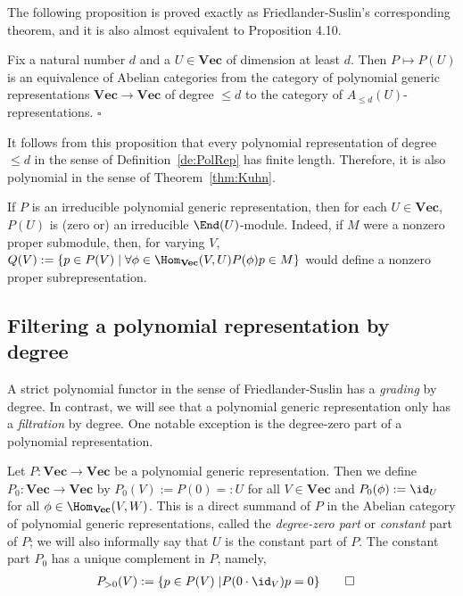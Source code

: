 \documentclass{amsart}
\renewcommand{\Vec}{\mathbf{Vec}}
\begin{document}
The following proposition is proved exactly as Friedlander-Suslin's
corresponding theorem, and it is also almost equivalent to
\cite{Kuhn94}{Proposition 4.10}.

\begin{prop} \label{prop:FriedlanderSuslin}
Fix a natural number $d$ and a $U \in \Vec$ of dimension at least $d$.
Then $P \mapsto P(U)$ is an equivalence of Abelian categories from the
category of polynomial generic representations $\Vec \to \Vec$ of degree
$\leq d$ to the category of $A_{\leq d}(U)$-representations.
\hfill $\square$
\end{prop}

\begin{re} \label{re:Kuhn}
It follows from this proposition that every polynomial
representation of degree $\leq d$ in the sense of
Definition~\ref{de:PolRep} has finite length. Therefore, it
is also polynomial in the sense of Theorem~\ref{thm:Kuhn}.
\end{re}

\begin{re} \label{re:Irred}
If $P$ is an irreducible polynomial generic representation, then for each
$U \in \Vec$, $P(U)$ is (zero or) an irreducible $\End(U)$-module. Indeed,
if $M$ were a nonzero proper submodule, then, for varying $V$, $Q(V):=\{p
\in P(V) \mid \forall \phi \in \Hom_\Vec(V,U) P(\phi)p \in M\}$ would
define a nonzero proper subrepresentation.
\end{re}

\subsection{Filtering a polynomial representation by degree}

A strict polynomial functor in the sense of Friedlander-Suslin has
a {\em grading} by degree. In contrast, we will see that a polynomial
generic representation only has a {\em filtration} by degree. One notable
exception is the degree-zero part of a polynomial
representation.

\begin{de} \label{de:DegreeZero}
Let $P:\Vec \to \Vec$ be a polynomial generic representation. Then we
define $P_0:\Vec \to \Vec$ by $P_0(V):=P(0)=:U$ for all $V \in \Vec$
and $P_0(\phi):=\id_U$ for all $\phi \in \Hom_\Vec(V,W)$. This is a direct
summand of $P$ in the Abelian category of polynomial generic
representations, called
the {\em degree-zero part} or {\em constant} part of $P$; we will also
informally say that $U$ is the constant part of $P$. The constant part
$P_0$ has a unique complement in $P$, namely,
\begin{align*} 
P_{>0}(V):=\{p \in P(V) \mid & P(0\cdot \id_V)p=0\}
\qedhere \end{align*}
\end{de}
\end{document}
